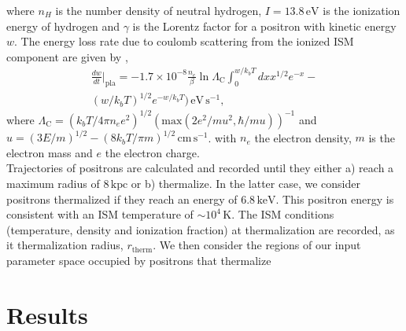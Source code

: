 \documentclass[a4paper,fleqn,usenatbib]{mnras}
\begin{document}
where $n_{H}$ is the number density of neutral hydrogen, $I = 13.8\,\mathrm{eV}$ is the ionization energy of hydrogen and $\gamma$ is the Lorentz factor for a positron with kinetic energy $w$. The energy loss rate due to coulomb scattering from the ionized ISM component are given by \citep{Huba2013},
\begin{multline}
\frac{dw}{dt}\bigg|_{\mathrm{pla}} = -1.7\times 10^{-8}\frac{n_e}{\beta}\ln{\Lambda_\mathrm{C}}\int_0^{w/k_bT} dx x^{1/2}e^{-x}-\\(w/k_bT)^{1/2}e^{-w/k_bT}) \,\mathrm{eV\,s^{-1}},
\end{multline}
where $
\Lambda_\mathrm{C} =  (k_bT/4\pi n_e e^2)^{1/2}(\mathrm{max}(2e^2/mu^2, \hbar/mu))^{-1}$ and $
u = (3E/m)^{1/2}-(8k_bT/\pi m)^{1/2}\,\mathrm{cm\,s^{-1}}$.
with $n_e$ the electron density, $m$ is the electron mass and $e$ the electron charge.\\
Trajectories of positrons are calculated and recorded until they either a) reach a maximum radius of $8\,\mathrm{kpc}$ or b) thermalize. In the latter case, we consider positrons thermalized if they reach an energy of $6.8\,\mathrm{keV}$. This positron energy is consistent with an ISM temperature of $\sim 10^4\,\mathrm{K}$. The ISM conditions (temperature, density and ionization fraction) at thermalization are recorded, as it thermalization radius, $r_\mathrm{therm}$. We then consider the regions of our input parameter space occupied by positrons that thermalize 
\section{Results}\label{sec:res}
\end{document}
